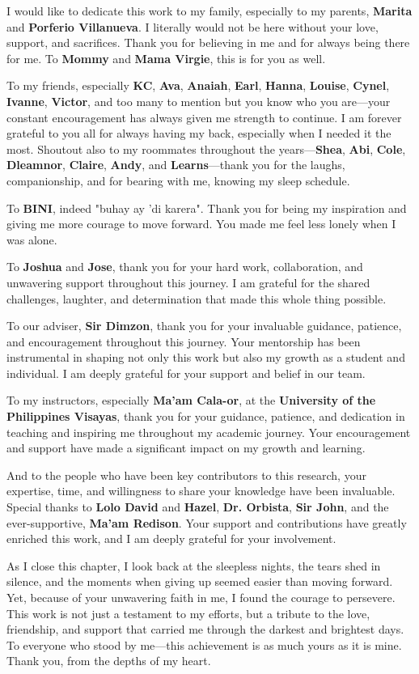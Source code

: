 I would like to dedicate this work to my family, especially to my parents, \textbf{Marita} and \textbf{Porferio Villanueva}. I literally would not be here without your love, support, and sacrifices. Thank you for believing in me and for always being there for me. To \textbf{Mommy} and \textbf{Mama Virgie}, this is for you as well.

To my friends, especially \textbf{KC}, \textbf{Ava}, \textbf{Anaiah}, \textbf{Earl}, \textbf{Hanna}, \textbf{Louise}, \textbf{Cynel}, \textbf{Ivanne}, \textbf{Victor}, and too many to mention but you know who you are—your constant encouragement has always given me strength to continue. I am forever grateful to you all for always having my back, especially when I needed it the most. Shoutout also to my roommates throughout the years—\textbf{Shea}, \textbf{Abi}, \textbf{Cole}, \textbf{Dleamnor}, \textbf{Claire}, \textbf{Andy}, and \textbf{Learns}—thank you for the laughs, companionship, and for bearing with me, knowing my sleep schedule.

To \textbf{BINI}, indeed "buhay ay 'di karera". Thank you for being my inspiration and giving me more courage to move forward. You made me feel less lonely when I was alone.

To \textbf{Joshua} and \textbf{Jose}, thank you for your hard work, collaboration, and unwavering support throughout this journey. I am grateful for the shared challenges, laughter, and determination that made this whole thing possible.

To our adviser, \textbf{Sir Dimzon}, thank you for your invaluable guidance, patience, and encouragement throughout this journey. Your mentorship has been instrumental in shaping not only this work but also my growth as a student and individual. I am deeply grateful for your support and belief in our team.

To my instructors, especially \textbf{Ma'am Cala-or}, at the \textbf{University of the Philippines Visayas}, thank you for your guidance, patience, and dedication in teaching and inspiring me throughout my academic journey. Your encouragement and support have made a significant impact on my growth and learning.

And to the people who have been key contributors to this research, your expertise, time, and willingness to share your knowledge have been invaluable. Special thanks to \textbf{Lolo David} and \textbf{Hazel}, \textbf{Dr. Orbista}, \textbf{Sir John}, and the ever-supportive, \textbf{Ma'am Redison}. Your support and contributions have greatly enriched this work, and I am deeply grateful for your involvement.

As I close this chapter, I look back at the sleepless nights, the tears shed in silence, and the moments when giving up seemed easier than moving forward. Yet, because of your unwavering faith in me, I found the courage to persevere. This work is not just a testament to my efforts, but a tribute to the love, friendship, and support that carried me through the darkest and brightest days. To everyone who stood by me---this achievement is as much yours as it is mine. Thank you, from the depths of my heart.